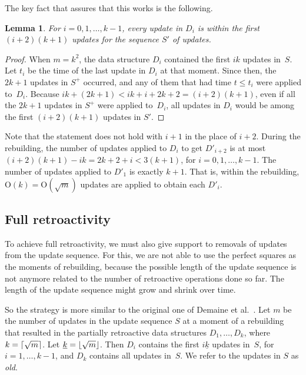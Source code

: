 \documentclass[reqno,11pt]{amsart}
\DeclarePairedDelimiter\ceil{\lceil}{\rceil}
\DeclarePairedDelimiter\floor{\lfloor}{\rfloor}
\newtheorem{lemma}     	[theorem] {Lemma}
\newcommand{\Oh}{\mathrm{O}}
\begin{document}
\medskip 

The key fact that assures that this works is the following. 

\begin{lemma}
  For $i=0,1,\ldots,k-1$, every update in $D_i$ is within 
  the first $(i+2)(k+1)$ updates for the sequence $S'$ of updates. 
\end{lemma}

\begin{proof}
  When $m=k^2$, the data structure $D_i$ contained the first $ik$ updates in~$S$. 
  Let $t_i$ be the time of the last update in $D_i$ at that moment.
  Since then, the $2k+1$ updates in $S^+$ occurred, 
  and any of them that had time $t \leq t_i$ were applied to~$D_i$. 
  Because $ik+(2k+1) < ik+i+2k+2 = (i+2)(k+1)$, 
  even if all the $2k+1$ updates in $S^+$ were applied to~$D_i$,
  all updates in $D_i$ would be among the first $(i+2)(k+1)$ updates in $S'$. 
\end{proof}

Note that the statement does not hold with $i+1$ in the place of $i+2$. 
During the rebuilding, the number of updates applied to $D_i$ to get $D'_{i+2}$ 
is at most $(i+2)(k+1)-ik = 2k+2+i < 3(k+1)$, for $i=0,1,\ldots,k-1$.  
The number of updates applied to $D'_1$ is exactly $k+1$.  That is, within the 
rebuilding, $\Oh(k) = \Oh(\sqrt{m})$ updates are applied to obtain each $D'_i$.

\subsection{Full retroactivity}\label{subsec:fully}

To achieve full retroactivity, 
we must also give support to removals of updates from the update sequence.  
For this, we are not able to use the perfect squares as the moments 
of rebuilding, because the possible length of the update sequence is
not anymore related to the number of retroactive operations done so far. 
The length of the update sequence might grow and shrink over time. 

So the strategy is more similar to the original one of Demaine et al.~\cite{DemaineIL2007}. 
Let $m$ be the number of updates in the update sequence $S$ at a 
moment of a rebuilding that resulted in the partially retroactive 
data structures $D_1,\ldots,D_k$, where $k=\ceil{\sqrt{m}}$.
Let $\underline{k} = \floor{\sqrt{m}}$.
Then $D_i$ contains the first $i\underline{k}$ updates in~$S$, 
for $i=1,\ldots,k-1$, and $D_k$ contains all updates in~$S$. 
We refer to the updates in $S$ as \emph{old}.
\end{document}
